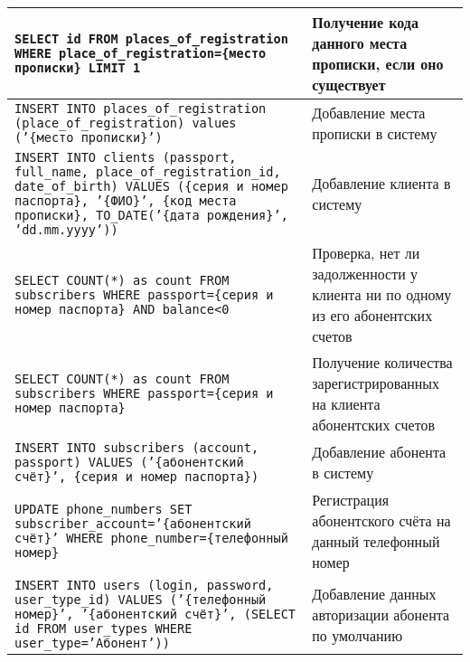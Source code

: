 \begin{xltabular}[h]{\textwidth}{|p{0.7 \textwidth}|X|}
    \texttt{SELECT id FROM places\_of\_registration WHERE place\_of\_registration=\{место прописки\} LIMIT 1}                                                                                                             & Получение кода данного места прописки, если оно существует                      \\ \hline
    \texttt{INSERT INTO places\_of\_registration (place\_of\_registration) values ('\{место прописки\}')}                                                                                                                 & Добавление места прописки в систему                                             \\ \hline
    \texttt{INSERT INTO clients (passport, full\_name, place\_of\_registration\_id, date\_of\_birth) VALUES (\{серия и номер паспорта\}, '\{ФИО\}', \{код места прописки\}, TO\_DATE('\{дата рождения\}', 'dd.mm.yyyy'))} & Добавление клиента в систему                                                    \\ \hline
    \texttt{SELECT COUNT(*) as count FROM subscribers WHERE passport=\{серия и номер паспорта\} AND balance<0}                                                                                                            & Проверка, нет ли задолженности у клиента ни по одному из его абонентских счетов \\ \hline
    \texttt{SELECT COUNT(*) as count FROM subscribers WHERE passport=\{серия и номер паспорта\}}                                                                                                                          & Получение количества зарегистрированных на клиента абонентских счетов           \\ \hline
    \texttt{INSERT INTO subscribers (account, passport) VALUES ('\{абонентский счёт\}', \{серия и номер паспорта\})}                                                                                                      & Добавление абонента в систему                                                   \\ \hline
    \texttt{UPDATE phone\_numbers SET subscriber\_account='\{абонентский счёт\}' WHERE phone\_number=\{телефонный номер\}}                                                                                                & Регистрация абонентского счёта на данный телефонный номер                       \\ \hline
    \texttt{INSERT INTO users (login, password, user\_type\_id) VALUES ('\{телефонный номер\}', '\{абонентский счёт\}', (SELECT id FROM user\_types WHERE user\_type='Абонент'))}                                         & Добавление данных авторизации абонента по умолчанию                             \\ \hline

\end{xltabular}
